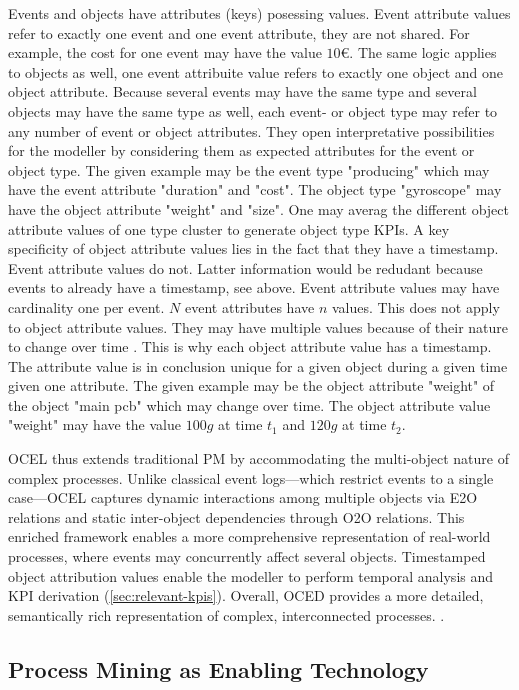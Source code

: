 Events and objects have attributes (keys) posessing values. Event attribute values refer to exactly one event and one event attribute, they are not shared. For example, the cost for one event may have the value $10€$. The same logic applies to objects as well, one event attribuite value refers to exactly one object and one object attribute. Because several events may have the same type and several objects may have the same type as well, each event- or object type may refer to any number of event or object attributes. They open interpretative possibilities for the modeller by considering them as expected attributes for the event or object type. The given example may be the event type "producing" which may have the event attribute "duration" and "cost". The object type "gyroscope" may have the object attribute "weight" and "size". One may averag the different object attribute values of one type cluster to generate object type KPIs. A key specificity of object attribute values lies in the fact that they have a timestamp. Event attribute values do not. Latter information would be redudant because events to already have a timestamp, see above. Event attribute values may have cardinality one per event. $N$ event attributes have $n$ values. This does not apply to object attribute values. They may have multiple values because of their nature to change over time \parencite{van2023object}. This is why each object attribute value has a timestamp. The attribute value is in conclusion unique for a given object during a given time given one attribute. The given example may be the object attribute "weight" of the object "main pcb" which may change over time. The object attribute value "weight" may have the value $100g$ at time $t_1$ and $120g$ at time $t_2$.


OCEL thus extends traditional PM by accommodating the  multi-object nature of complex processes. Unlike classical event logs—which restrict events to a single case—OCEL captures dynamic interactions among multiple objects via E2O relations and static inter-object dependencies through O2O relations. This enriched framework enables a more comprehensive representation of real-world processes, where events may concurrently affect several objects. Timestamped object attribution values enable the modeller to perform temporal analysis and KPI derivation (\autoref{sec:relevant-kpis}). Overall, OCED provides a more detailed, semantically rich representation of complex, interconnected processes. \parencite{van2023object}.

\subsection{Process Mining as Enabling Technology}
\label{sec:process-mining-enabling-technology}

